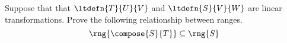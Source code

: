 Suppose that that $\ltdefn{T}{U}{V}$ and $\ltdefn{S}{V}{W}$ are linear transformations.  Prove the following relationship between ranges.
%
\begin{equation*}
\rng{\compose{S}{T}}\subseteq\rng{S}
\end{equation*}